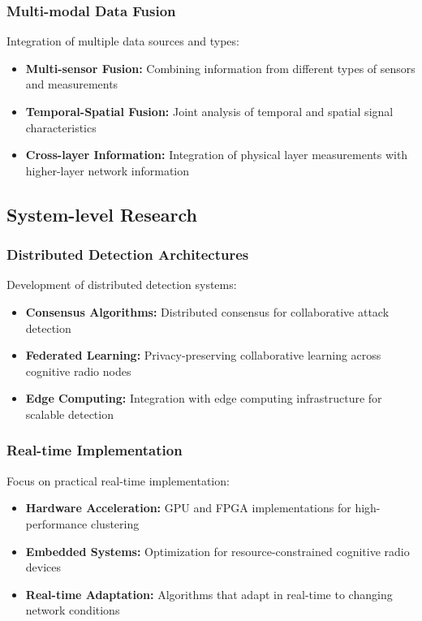 \subsubsection{Multi-modal Data Fusion}
Integration of multiple data sources and types:
\begin{itemize}
\item \textbf{Multi-sensor Fusion:} Combining information from different types of sensors and measurements
\item \textbf{Temporal-Spatial Fusion:} Joint analysis of temporal and spatial signal characteristics
\item \textbf{Cross-layer Information:} Integration of physical layer measurements with higher-layer network information
\end{itemize}

\subsection{System-level Research}

\subsubsection{Distributed Detection Architectures}
Development of distributed detection systems:
\begin{itemize}
\item \textbf{Consensus Algorithms:} Distributed consensus for collaborative attack detection
\item \textbf{Federated Learning:} Privacy-preserving collaborative learning across cognitive radio nodes
\item \textbf{Edge Computing:} Integration with edge computing infrastructure for scalable detection
\end{itemize}

\subsubsection{Real-time Implementation}
Focus on practical real-time implementation:
\begin{itemize}
\item \textbf{Hardware Acceleration:} GPU and FPGA implementations for high-performance clustering
\item \textbf{Embedded Systems:} Optimization for resource-constrained cognitive radio devices
\item \textbf{Real-time Adaptation:} Algorithms that adapt in real-time to changing network conditions
\end{itemize}

